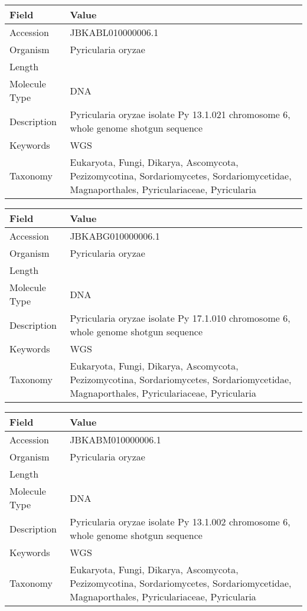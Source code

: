\documentclass[10pt]{article}
\begin{document}
\vspace{1em}
{\footnotesize
\begin{longtable}{>{\raggedright\arraybackslash}p{4.5cm} >{\raggedright\arraybackslash}p{11.5cm}}
\textbf{Field} & \textbf{Value} \\
\hline
Accession & JBKABL010000006.1 \\
Organism & Pyricularia oryzae \\
Length & 6041258 \\
Molecule Type & DNA \\
Description & Pyricularia oryzae isolate Py 13.1.021 chromosome 6, whole genome shotgun sequence \\
Keywords & WGS \\
Taxonomy & Eukaryota, Fungi, Dikarya, Ascomycota, Pezizomycotina, Sordariomycetes, Sordariomycetidae, Magnaporthales, Pyriculariaceae, Pyricularia \\
\end{longtable}
}

\vspace{1em}
{\footnotesize
\begin{longtable}{>{\raggedright\arraybackslash}p{4.5cm} >{\raggedright\arraybackslash}p{11.5cm}}
\textbf{Field} & \textbf{Value} \\
\hline
Accession & JBKABG010000006.1 \\
Organism & Pyricularia oryzae \\
Length & 6061630 \\
Molecule Type & DNA \\
Description & Pyricularia oryzae isolate Py 17.1.010 chromosome 6, whole genome shotgun sequence \\
Keywords & WGS \\
Taxonomy & Eukaryota, Fungi, Dikarya, Ascomycota, Pezizomycotina, Sordariomycetes, Sordariomycetidae, Magnaporthales, Pyriculariaceae, Pyricularia \\
\end{longtable}
}

\vspace{1em}
{\footnotesize
\begin{longtable}{>{\raggedright\arraybackslash}p{4.5cm} >{\raggedright\arraybackslash}p{11.5cm}}
\textbf{Field} & \textbf{Value} \\
\hline
Accession & JBKABM010000006.1 \\
Organism & Pyricularia oryzae \\
Length & 5895648 \\
Molecule Type & DNA \\
Description & Pyricularia oryzae isolate Py 13.1.002 chromosome 6, whole genome shotgun sequence \\
Keywords & WGS \\
Taxonomy & Eukaryota, Fungi, Dikarya, Ascomycota, Pezizomycotina, Sordariomycetes, Sordariomycetidae, Magnaporthales, Pyriculariaceae, Pyricularia \\
\end{longtable}
}
\end{document}
